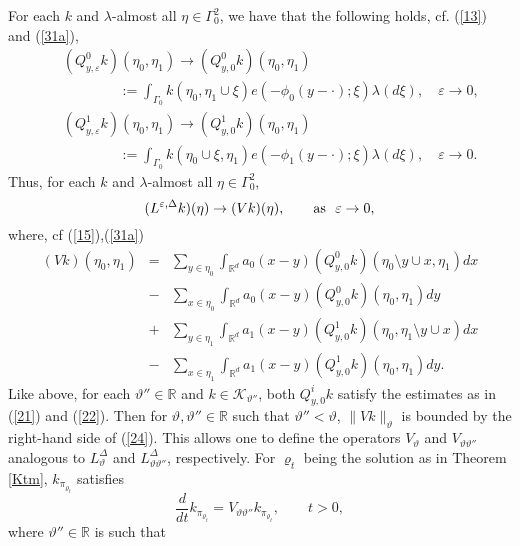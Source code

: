 \documentclass[reqno,11pt]{amsart}
\theoremstyle{definition}
\theoremstyle{remark}
\numberwithin{equation}{section}
\begin{document}
For each $k$ and $\lambda$-almost all $\eta \in \Gamma^2_0$, we have
that the following holds, cf. (\ref{13}) and (\ref{31a}),
\begin{eqnarray*}
  
& & (Q^0_{y,\varepsilon} k) (\eta_0,\eta_1) \to (Q^0_{y,0} k)
(\eta_0,\eta_1)\\[.2cm] & & \qquad \qquad := \int_{\Gamma_0} k(\eta_0, \eta_1\cup \xi)
e(-\phi_0 (y - \cdot);\xi)\lambda (d\xi), \quad \varepsilon \to 0,\nonumber \\[.2cm]
& & (Q^1_{y,\varepsilon} k) (\eta_0,\eta_1) \to (Q^1_{y,0} k)
(\eta_0,\eta_1) \nonumber \\[.2cm] & & \qquad \qquad := \int_{\Gamma_0} k(\eta_0\cup \xi, \eta_1)
e(-\phi_1 (y - \cdot);\xi)\lambda (d\xi), \quad \varepsilon \to 0.
\nonumber
\end{eqnarray*}
Thus, for each $k$ and $\lambda$-almost all $\eta \in \Gamma^2_0$,
\[
(L^{\varepsilon, \Delta} k)(\eta) \to (Vk)(\eta), \qquad {\rm as } \
\ \varepsilon \to 0,
\]
where, cf (\ref{15}),(\ref{31a})
\begin{eqnarray}
  \label{35}
 (Vk)(\eta_0 , \eta_1)  & = & \sum_{y\in \eta_0}
\int_{\mathds{R}^d} a_0 (x-y) (Q_{y,0}^0 k) (\eta_0\setminus y \cup
x,
\eta_1) d x \nonumber \\[.2cm]
& - & \sum_{x\in \eta_0} \int_{\mathds{R}^d} a_0 (x-y) (Q_{y,0}^0 k)
(\eta_0,
\eta_1) d y  \\[.2cm]
& + & \sum_{y\in \eta_1} \int_{\mathds{R}^d} a_1 (x-y) (Q_{y,0}^1 k)
(\eta_0,
\eta_1\setminus y \cup x) d x \nonumber \\[.2cm] & - & \sum_{x\in \eta_1} \int_{\mathds{R}^d} a_1 (x-y)
(Q_{y,0}^1 k) (\eta_0, \eta_1) d y. \nonumber
\end{eqnarray}
Like above, for each $\vartheta''\in \mathds{R}$ and $k\in
\mathcal{K}_{\vartheta''}$, both $Q^i_{y,0}k$ satisfy the estimates
as in (\ref{21}) and (\ref{22}). Then for $\vartheta,\vartheta''\in
\mathds{R}$ such that $\vartheta'' < \vartheta$, $\|V
k\|_{\vartheta}$ is bounded by the right-hand side of (\ref{24}).
This allows one to define the operators $V_\vartheta$ and
$V_{\vartheta\vartheta''}$ analogous to $L^\Delta_\vartheta$ and
$L^\Delta_{\vartheta\vartheta''}$, respectively. For $\varrho_t$
being the solution as in Theorem \ref{Ktm}, $k_{\pi_{\varrho_t}}$
satisfies
\begin{equation}
  \label{J}
\frac{d}{dt} k_{\pi_{\varrho_t}} = V_{\vartheta \vartheta''}
k_{\pi_{\varrho_t}}, \qquad t>0,
\end{equation}
where $\vartheta''\in \mathds{R}$ is such that
\end{document}
